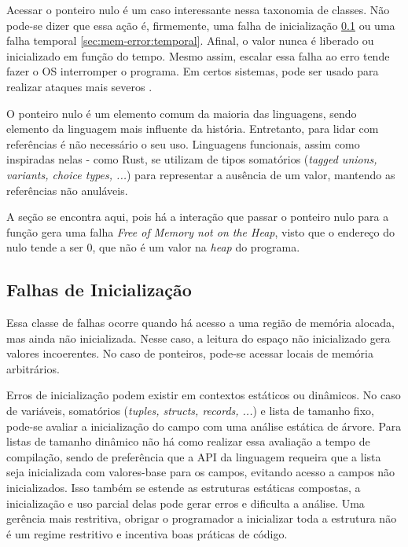 Acessar o ponteiro nulo é um caso interessante nessa taxonomia de classes. Não pode-se dizer que essa ação é, firmemente, uma falha de inicialização \ref{sec:mem-error:init} ou uma falha temporal \ref{sec:mem-error:temporal}. Afinal, o valor nunca é liberado ou inicializado em função do tempo. Mesmo assim, escalar essa falha ao erro tende fazer o OS interromper o programa. Em certos sistemas, pode ser usado para realizar ataques mais severos \cite[p.4]{MemErrorPastPresentFuture}.

O ponteiro nulo é um elemento comum da maioria das linguagens, sendo elemento da linguagem mais influente da história. Entretanto, para lidar com referências é não necessário o seu uso. Linguagens funcionais, assim como inspiradas nelas - como Rust, se utilizam de tipos somatórios (\emph{tagged unions, variants, choice types, ...}) para representar a ausência de um valor, mantendo as referências não anuláveis.

A seção se encontra aqui, pois há a interação que passar o ponteiro nulo para a função \FREE gera uma falha \emph{Free of Memory not on the Heap}, visto que o endereço do nulo tende a ser 0, que não é um valor na \emph{heap} do programa.


\subsection{Falhas de Inicialização}
\label{sec:mem-error:init}

Essa classe de falhas ocorre quando há acesso a uma região de memória alocada, mas ainda não inicializada. Nesse caso, a leitura do espaço não inicializado gera valores incoerentes. No caso de ponteiros, pode-se acessar locais de memória arbitrários.

Erros de inicialização podem existir em contextos estáticos ou dinâmicos. No caso de variáveis, somatórios (\emph{tuples, structs, records, ...}) e lista de tamanho fixo, pode-se avaliar a inicialização do campo com uma análise estática de árvore. Para listas de tamanho dinâmico não há como realizar essa avaliação a tempo de compilação, sendo de preferência que a API da linguagem requeira que a lista seja inicializada com valores-base para os campos, evitando acesso a campos não inicializados. Isso também se estende as estruturas estáticas compostas, a inicialização e uso parcial delas pode gerar erros e dificulta a análise. Uma gerência mais restritiva, obrigar o programador a inicializar toda a estrutura não é um regime restritivo e incentiva boas práticas de código.

